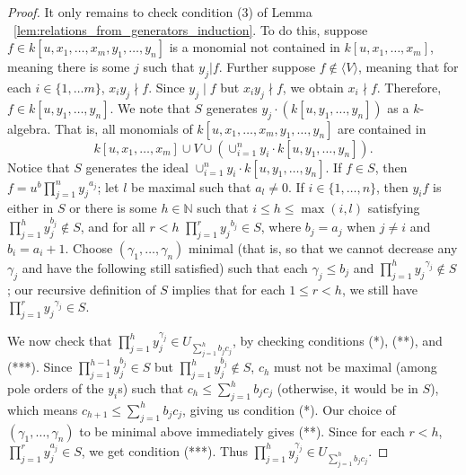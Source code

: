 \documentclass{amsart}
\theoremstyle{plain}
\theoremstyle{definition}
\theoremstyle{remark}
\numberwithin{equation}{section}
\begin{document}
\begin{proof}
It only remains to check condition (3) of Lemma ~\ref{lem:relations_from_generators_induction}. To do this, suppose $f\in k[u, x_1, \ldots, x_m, y_1, \ldots, y_n]$ is a monomial not contained in $k[u, x_1, \ldots, x_m]$, meaning there is some $j$ such that $y_j|f$.  Further suppose $f\not\in \langle V \rangle$, meaning that for each $i\in \{1, \ldots m\}$, $x_iy_j \nmid f$. Since $y_j \mid f$ but $x_iy_j \nmid f$, we obtain $x_i\nmid f$.  Therefore, $f\in k[u, y_1, \ldots, y_n]$.  We note that $S$ generates $y_j \cdot (k[u,y_1, \ldots, y_n])$ as a $k$-algebra.  That is, all monomials of $k[u, x_1, \ldots, x_m, y_1, \ldots, y_n]$ are contained in
\[
	k[u, x_1, \ldots, x_m] \cup V \cup \left(\cup_{i=1}^n y_i \cdot k[u, y_1, \ldots, y_n]\right). 
\]
Notice that $S$ generates the ideal $\cup_{i=1}^n y_i \cdot k[u, y_1, \ldots, y_n]$.  If $f\in S$, then $f=u^b \prod_{j=1}^n {y_j}^{a_j}$; let $l$ be maximal such that $a_l\ne 0$.
If $i\in \{1, \ldots, n\}$, then $y_i f$ is either in $S$ or there is some $h\in \mathbb{N}$ such that $i\le h\le \max(i,l)$ satisfying $\prod_{j=1}^h y_j^{b_j}\not\in S$, 
and for all $r<h$ $\prod_{j=1}^r {y_j}^{b_j}\in S$, where $b_j=a_j$ when $j\ne i$ and $b_i=a_i+1$.  Choose $(\gamma_1, \ldots, \gamma_n)$ minimal (that is, so that we cannot decrease any $\gamma_j$ and have the following still satisfied) such that each $\gamma_j\le b_j$ and $\prod_{j=1}^h {y_j}^{\gamma_j}\not\in S$; our recursive definition of $S$ implies that for each $1\le r< h$, we still have $\prod_{j=1}^r {y_j}^{\gamma_j}\in S$.

We now check that $\prod_{j=1}^h y_j^{\gamma_j}\in U_{\sum_{j=1}^h b_j c_j}$, by checking conditions (*), (**), and (***).  Since $\prod_{j=1}^{h-1} y_j^{b_j}\in S$ but $\prod_{j=1}^h y_j^{b_j}\not\in S$, $c_h$ must not be maximal (among pole orders of the $y_i$s) such that $c_h \le \sum_{j=1}^h b_jc_j$ (otherwise, it would be in $S$), which means $c_{h+1}\le \sum_{j=1}^h b_jc_j$, giving us condition (*).  Our choice of $(\gamma_1, \ldots, \gamma_n)$ to be minimal above immediately gives (**).  Since for each $r<h$, $\prod_{j=1}^r y_{j}^{a_j}\in S$, we get condition (***).  Thus $\prod_{j=1}^h y_j^{\gamma_j}\in U_{\sum_{j=1}^h b_j c_j}$.


\end{proof}
\end{document}
